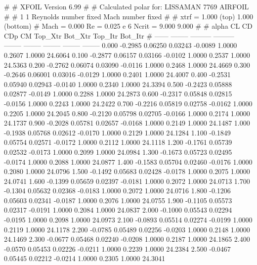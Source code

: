 #  
#       XFOIL         Version 6.99
#  
# Calculated polar for: LISSAMAN 7769 AIRFOIL                           
#  
# 1 1 Reynolds number fixed          Mach number fixed         
#  
# xtrf =   1.000 (top)        1.000 (bottom)  
# Mach =   0.000     Re =     0.025 e 6     Ncrit =   9.000  9.000
#  
#   alpha    CL        CD       CDp       CM     Top_Xtr  Bot_Xtr  Top_Itr  Bot_Itr
#  ------ -------- --------- --------- -------- -------- -------- -------- --------
   0.000  -0.2985   0.06250   0.03243  -0.0089   1.0000   0.2607   1.0000  24.6064
   0.100  -0.2877   0.06157   0.03166  -0.0102   1.0000   0.2537   1.0000  24.5363
   0.200  -0.2762   0.06074   0.03090  -0.0116   1.0000   0.2468   1.0000  24.4669
   0.300  -0.2646   0.06001   0.03016  -0.0129   1.0000   0.2401   1.0000  24.4007
   0.400  -0.2531   0.05940   0.02943  -0.0140   1.0000   0.2340   1.0000  24.3394
   0.500  -0.2423   0.05888   0.02877  -0.0149   1.0000   0.2288   1.0000  24.2873
   0.600  -0.2317   0.05848   0.02815  -0.0156   1.0000   0.2243   1.0000  24.2422
   0.700  -0.2216   0.05819   0.02758  -0.0162   1.0000   0.2205   1.0000  24.2045
   0.800  -0.2120   0.05798   0.02705  -0.0166   1.0000   0.2174   1.0000  24.1737
   0.900  -0.2028   0.05781   0.02657  -0.0168   1.0000   0.2149   1.0000  24.1487
   1.000  -0.1938   0.05768   0.02612  -0.0170   1.0000   0.2129   1.0000  24.1284
   1.100  -0.1849   0.05754   0.02571  -0.0172   1.0000   0.2112   1.0000  24.1118
   1.200  -0.1761   0.05739   0.02532  -0.0173   1.0000   0.2099   1.0000  24.0984
   1.300  -0.1673   0.05723   0.02495  -0.0174   1.0000   0.2088   1.0000  24.0877
   1.400  -0.1583   0.05704   0.02460  -0.0176   1.0000   0.2080   1.0000  24.0796
   1.500  -0.1492   0.05683   0.02428  -0.0178   1.0000   0.2075   1.0000  24.0741
   1.600  -0.1399   0.05659   0.02397  -0.0181   1.0000   0.2072   1.0000  24.0713
   1.700  -0.1304   0.05632   0.02368  -0.0183   1.0000   0.2072   1.0000  24.0716
   1.800  -0.1206   0.05603   0.02341  -0.0187   1.0000   0.2076   1.0000  24.0755
   1.900  -0.1105   0.05573   0.02317  -0.0191   1.0000   0.2084   1.0000  24.0837
   2.000  -0.1000   0.05543   0.02294  -0.0195   1.0000   0.2098   1.0000  24.0973
   2.100  -0.0893   0.05514   0.02274  -0.0199   1.0000   0.2119   1.0000  24.1178
   2.200  -0.0785   0.05489   0.02256  -0.0203   1.0000   0.2148   1.0000  24.1469
   2.300  -0.0677   0.05468   0.02240  -0.0208   1.0000   0.2187   1.0000  24.1865
   2.400  -0.0570   0.05453   0.02226  -0.0211   1.0000   0.2239   1.0000  24.2384
   2.500  -0.0467   0.05445   0.02212  -0.0214   1.0000   0.2305   1.0000  24.3041
